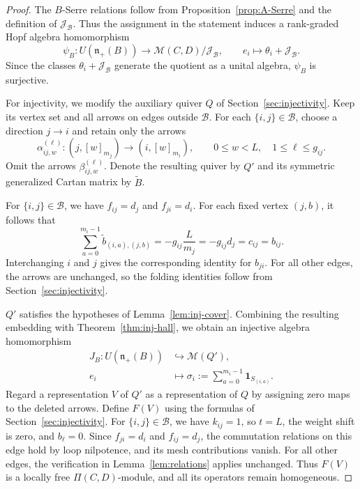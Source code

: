 \documentclass[12pt,reqno]{amsart}
\numberwithin{equation}{section}
\theoremstyle{definition}
\theoremstyle{remark}
\newcommand{\nplus}{\mathfrak n_+}
\theoremstyle{plain}
\theoremstyle{plain}
\begin{document}
\begin{proof}
    The $B$-Serre relations follow from Proposition~\ref{prop:A-Serre} and the definition of $\mathcal J_{\mathscr B}$. Thus the assignment in the statement induces a rank-graded Hopf algebra homomorphism
\[
    \psi_B:U(\nplus(B))
    \longrightarrow
    \mathcal M(C,D)/\mathcal J_{\mathscr B},
    \qquad
    e_i\longmapsto\theta_i+\mathcal J_{\mathscr B}.
\]
Since the classes $\theta_i+\mathcal J_{\mathscr B}$ generate the quotient as a unital algebra, $\psi_B$ is surjective.

For injectivity, we modify the auxiliary quiver $Q$ of Section~\ref{sec:injectivity}. Keep its vertex set and all arrows on edges outside $\mathscr B$. For each $\{i,j\}\in\mathscr B$, choose a direction $j\to i$ and retain only the arrows
\[
    \alpha_{ij,w}^{(\ell)}:
    (j,[w]_{m_j})\longrightarrow(i,[w]_{m_i}),
    \qquad
    0\le w<L,\quad 1\le\ell\le g_{ij}.
\]
Omit the arrows $\beta_{ij,w}^{(\ell)}$. Denote the resulting quiver by $Q'$ and its symmetric generalized Cartan matrix by $\widetilde B$.

For $\{i,j\}\in\mathscr B$, we have $f_{ij}=d_j$ and $f_{ji}=d_i$. For each fixed vertex $(j,b)$, it follows that
\[
    \sum_{a=0}^{m_i-1}
        \widetilde b_{(i,a),(j,b)}
    =-g_{ij}\frac{L}{m_j}
    =-g_{ij}d_j
    =c_{ij}
    =b_{ij}.
\]
Interchanging $i$ and $j$ gives the corresponding identity for $b_{ji}$. For all other edges, the arrows are unchanged, so the folding identities follow from Section~\ref{sec:injectivity}.

$Q'$ satisfies the hypotheses of Lemma~\ref{lem:inj-cover}. Combining the resulting embedding with Theorem~\ref{thm:inj-hall}, we obtain an injective algebra homomorphism
\[
\begin{aligned}
    J_B:U(\nplus(B))&\hookrightarrow\mathcal M(Q'),\\
    e_i&\longmapsto
    \sigma_i:=
    \sum_{a=0}^{m_i-1}\mathbf1_{S_{(i,a)}}.
\end{aligned}
\]
Regard a representation $V$ of $Q'$ as a representation of $Q$ by assigning zero maps to the deleted arrows. Define $F(V)$ using the formulas of Section~\ref{sec:injectivity}. For $\{i,j\}\in\mathscr B$, we have $k_{ij}=1$, so $t=L$, the weight shift is zero, and $b_\ell=0$. Since $f_{ji}=d_i$ and $f_{ij}=d_j$, the commutation relations on this edge hold by loop nilpotence, and its mesh contributions vanish. For all other edges, the verification in Lemma~\ref{lem:relations} applies unchanged. Thus $F(V)$ is a locally free $\Pi(C,D)$-module, and all its operators remain homogeneous.


\end{proof}
\end{document}

